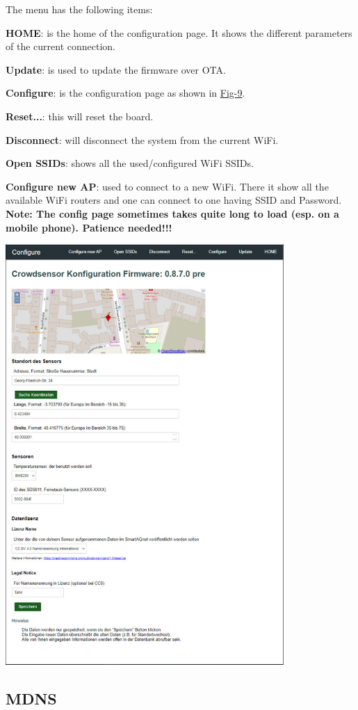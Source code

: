 The menu has the following items\+:
\begin{DoxyEnumerate}
\item {\bfseries{H\+O\+ME}}\+: is the home of the configuration page. It shows the different parameters of the current connection.
\item {\bfseries{Update}}\+: is used to update the firmware over O\+TA.
\item {\bfseries{Configure}}\+: is the configuration page as shown in \mbox{\hyperlink{index_Fig-9}{Fig-\/9}}.
\item {\bfseries{Reset...}}\+: this will reset the board.
\item {\bfseries{Disconnect}}\+: will disconnect the system from the current Wi\+Fi.
\item {\bfseries{Open S\+S\+I\+Ds}}\+: shows all the used/configured Wi\+Fi S\+S\+I\+Ds.
\item {\bfseries{Configure new AP}}\+: used to connect to a new Wi\+Fi. There it show all the available Wi\+Fi routers and one can connect to one having S\+S\+ID and Password.~\newline
 {\bfseries{Note\+: The config page sometimes takes quite long to load (esp. on a mobile phone). Patience needed!!!}}  \label{index_Fig-9}%
%
  
\begin{DoxyImage}
\includegraphics[width=400px]{configr}
\end{DoxyImage}

\end{DoxyEnumerate}\hypertarget{index_mdns}{}\subsection{M\+D\+NS}\label{index_mdns}
